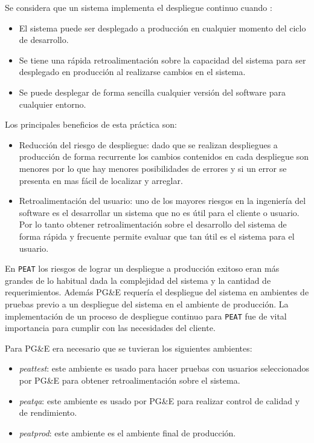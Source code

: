 Se considera que un sistema implementa el despliegue continuo cuando
\cite{27_martin_fowler_cd}:
\begin{itemize}
\item El sistema puede ser desplegado a producción en cualquier momento del
  ciclo de desarrollo.
\item Se tiene una rápida retroalimentación sobre la capacidad del sistema
  para ser desplegado en producción al realizarse cambios en el sistema.
\item Se puede desplegar de forma sencilla cualquier versión del software para
  cualquier entorno.
\end{itemize}

Los principales beneficios de esta práctica son:
\begin{itemize}
\item Reducción del riesgo de despliegue: dado que se realizan despliegues
  a producción de forma recurrente los cambios contenidos en cada despliegue
  son menores por lo que hay menores posibilidades de errores y si un error
  se presenta en mas fácil de localizar y arreglar.
\item Retroalimentación del usuario: uno de los mayores riesgos en la ingeniería
  del software es el desarrollar un sistema que no es útil para el cliente o usuario.
  Por lo tanto obtener retroalimentación sobre el desarrollo del sistema de forma
  rápida y frecuente permite evaluar que tan útil es el sistema para el usuario.
\end{itemize}

En \texttt{PEAT} los riesgos de lograr un despliegue a producción exitoso
eran más grandes de lo habitual dada la complejidad del sistema y la cantidad
de requerimientos. Además PG\&E requería el despliegue del sistema en ambientes
de pruebas previo a un despliegue del sistema en el ambiente de producción.
La implementación de un proceso de despliegue continuo para \texttt{PEAT} fue de
vital importancia para cumplir con las necesidades del cliente.

\vspace{2.5mm}

Para PG\&E era necesario que se tuvieran los siguientes ambientes:
\begin{itemize}
\item \textit{peattest}: este ambiente es usado para hacer pruebas con usuarios
  seleccionados por PG\&E para obtener retroalimentación sobre el sistema.
\item \textit{peatqa}: este ambiente es usado por PG\&E para realizar control de
  calidad y de rendimiento.
\item \textit{peatprod}: este ambiente es el ambiente final de producción.
\end{itemize}

